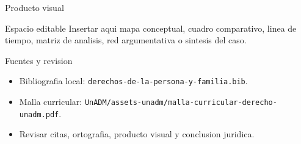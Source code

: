 \documentclass[
  spanish,
  aspectratio=169,
  xcolor={dvipsnames,table}
]{beamer}
\begin{document}
\begin{frame}{Producto visual}
  \begin{block}{Espacio editable}
    Insertar aqui mapa conceptual, cuadro comparativo, linea de tiempo,
    matriz de analisis, red argumentativa o sintesis del caso.
  \end{block}
  \centering
\end{frame}

\begin{frame}{Fuentes y revision}
  \begin{itemize}
    \item Bibliografia local: \texttt{derechos-de-la-persona-y-familia.bib}.
    \item Malla curricular: \texttt{UnADM/assets-unadm/malla-curricular-derecho-unadm.pdf}.
    \item Revisar citas, ortografia, producto visual y conclusion juridica.
  \end{itemize}
\end{frame}
\end{document}
